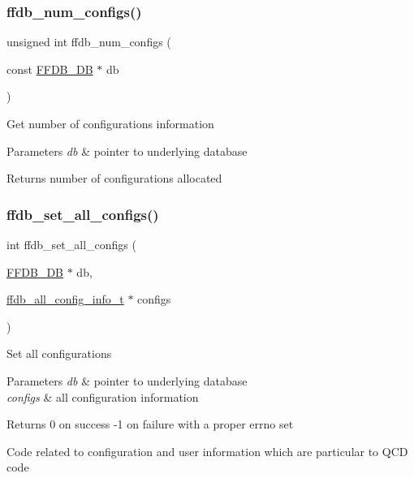 \subsubsection{\texorpdfstring{ffdb\_num\_configs()}{ffdb\_num\_configs()}}
{\footnotesize\ttfamily unsigned int ffdb\+\_\+num\+\_\+configs (\begin{DoxyParamCaption}\item[{const \mbox{\hyperlink{adat-devel_2other__libs_2filedb_2filehash_2ffdb__db_8h_a0b27b956926453a7a8141ea8e10f0df8}{F\+F\+D\+B\+\_\+\+DB}} $\ast$}]{db }\end{DoxyParamCaption})}

Get number of configurations information


\begin{DoxyParams}{Parameters}
{\em db} & pointer to underlying database\\
\hline
\end{DoxyParams}
\begin{DoxyReturn}{Returns}
number of configurations allocated 
\end{DoxyReturn}
\mbox{\label{adat-devel_2other__libs_2filedb_2filehash_2ffdb__db_8h_a025a0fd1b0b76b024679498011af4bc3}} 
\subsubsection{\texorpdfstring{ffdb\_set\_all\_configs()}{ffdb\_set\_all\_configs()}}
{\footnotesize\ttfamily int ffdb\+\_\+set\+\_\+all\+\_\+configs (\begin{DoxyParamCaption}\item[{\mbox{\hyperlink{adat-devel_2other__libs_2filedb_2filehash_2ffdb__db_8h_a0b27b956926453a7a8141ea8e10f0df8}{F\+F\+D\+B\+\_\+\+DB}} $\ast$}]{db,  }\item[{\mbox{\hyperlink{adat-devel_2other__libs_2filedb_2filehash_2ffdb__db_8h_afc17234e7cd387e11de55b92df6bb0e5}{ffdb\+\_\+all\+\_\+config\+\_\+info\+\_\+t}} $\ast$}]{configs }\end{DoxyParamCaption})}

Set all configurations


\begin{DoxyParams}{Parameters}
{\em db} & pointer to underlying database \\
\hline
{\em configs} & all configuration information\\
\hline
\end{DoxyParams}
\begin{DoxyReturn}{Returns}
0 on success -\/1 on failure with a proper errno set
\end{DoxyReturn}
Code related to configuration and user information which are particular to Q\+CD code \mbox{\label{adat-devel_2other__libs_2filedb_2filehash_2ffdb__db_8h_ae36e14bba7052f0de66a7b5d1308f9ba}} 
